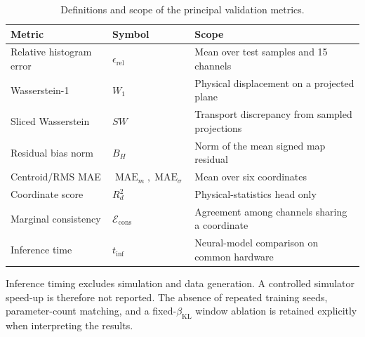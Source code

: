 \begin{table}[H]
    \centering
    \caption{Definitions and scope of the principal validation metrics.}
    \label{tab:metrics_definitions}
    \begin{tabular}{lll}
        \toprule
        Metric & Symbol & Scope \\
        \midrule
        Relative histogram error & $\epsilon_{\mathrm{rel}}$ & Mean over test samples and 15 channels \\
        Wasserstein-1 & $W_1$ & Physical displacement on a projected plane \\
        Sliced Wasserstein & $SW$ & Transport discrepancy from sampled projections \\
        Residual bias norm & $B_H$ & Norm of the mean signed map residual \\
        Centroid/RMS MAE & $\operatorname{MAE}_{m},\operatorname{MAE}_{\sigma}$ & Mean over six coordinates \\
        Coordinate score & $R_d^2$ & Physical-statistics head only \\
        Marginal consistency & $\mathcal{E}_{\mathrm{cons}}$ & Agreement among channels sharing a coordinate \\
        Inference time & $t_{\mathrm{inf}}$ & Neural-model comparison on common hardware \\
        \bottomrule
    \end{tabular}
\end{table}

Inference timing excludes simulation and data generation. A controlled simulator speed-up is therefore not reported. The absence of repeated training seeds, parameter-count matching, and a fixed-$\beta_{\mathrm{KL}}$ window ablation is retained explicitly when interpreting the results.

